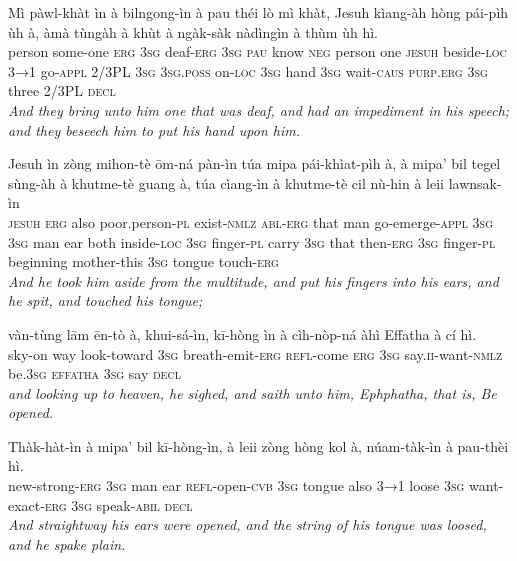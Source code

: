 \documentclass[11pt,a4paper]{article}
\begin{document}
\begin{exe}
\gll Mì pàwl-khàt ìn à bilngong-ìn à pau théi lò mì khàt, Jesuh kìang-àh hòng pái-pìh ùh à, àmà tùngàh à khùt à ngàk-sàk nàdìngìn à thùm ùh hì. \\
     person some-one \textsc{erg} \textsc{3sg} deaf-\textsc{erg} \textsc{3sg} \textsc{pau} know \textsc{neg} person one \textsc{jesuh} beside-\textsc{loc} \textsc{3→1} go-\textsc{appl} 2/3PL \textsc{3sg} \textsc{3sg}.\textsc{poss} on-\textsc{loc} \textsc{3sg} hand \textsc{3sg} wait-\textsc{caus} \textsc{purp}.\textsc{erg} \textsc{3sg} three 2/3PL \textsc{decl} \\
\glt \textcolor{kjvcolor}{\textit{And they bring unto him one that was deaf, and had an impediment in his speech; and they beseech him to put his hand upon him.}}

\gll Jesuh ìn zòng mihon-tè ōm-ná pàn-ìn túa mipa pái-khìat-pìh à, à mipa' bil tegel sùng-àh à khutme-tè guang à, túa cìang-ìn à khutme-tè cil nù-hin à leii lawnsak-ìn \\
     \textsc{jesuh} \textsc{erg} also poor.person-\textsc{pl} exist-\textsc{nmlz} \textsc{abl}-\textsc{erg} that man go-emerge-\textsc{appl} \textsc{3sg} \textsc{3sg} man ear both inside-\textsc{loc} \textsc{3sg} finger-\textsc{pl} carry \textsc{3sg} that then-\textsc{erg} \textsc{3sg} finger-\textsc{pl} beginning mother-this \textsc{3sg} tongue touch-\textsc{erg} \\
\glt \textcolor{kjvcolor}{\textit{And he took him aside from the multitude, and put his fingers into his ears, and he spit, and touched his tongue;}}

\gll vàn-tùng lām ēn-tò à, khui-sá-ìn, kī-hòng ìn à cìh-nòp-ná àhì  Effatha à cí hì. \\
     sky-on way look-toward \textsc{3sg} breath-emit-\textsc{erg} \textsc{refl}-come \textsc{erg} \textsc{3sg} say.\textsc{ii}-want-\textsc{nmlz} be.\textsc{3sg}  \textsc{effatha} \textsc{3sg} say \textsc{decl} \\
\glt \textcolor{kjvcolor}{\textit{and looking up to heaven, he sighed, and saith unto him, Ephphatha, that is, Be opened.}}

\gll Thàk-hàt-ìn à mipa' bil kī-hòng-ìn, à leii zòng hòng kol à, núam-tàk-ìn à pau-thèi hì. \\
     new-strong-\textsc{erg} \textsc{3sg} man ear \textsc{refl}-open-\textsc{cvb} \textsc{3sg} tongue also \textsc{3→1} loose \textsc{3sg} want-exact-\textsc{erg} \textsc{3sg} speak-\textsc{abil} \textsc{decl} \\
\glt \textcolor{kjvcolor}{\textit{And straightway his ears were opened, and the string of his tongue was loosed, and he spake plain.}}


\end{exe}
\end{document}
